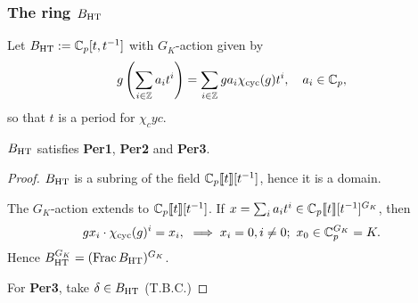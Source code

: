 \subsubsection{The ring \texorpdfstring{$B_{\mathrm{HT}}$}{B-HT}}

Let $B_{\mathrm{HT}} := \mathbb{C}_p[t, t^{-1}]$ with $G_K$-action given by \[g\left( \sum_{i\in\mathbb{Z}} a_it^i  \right) = \sum_{i\in\mathbb{Z}} ga_i\chi_{\mathrm{cyc}}(g)t^i,\quad a_i\in\mathbb{C}_p,\]
so that $t$ is a period for $\chi_cyc$.
\begin{proposition}
    $B_{\mathrm{HT}}$ satisfies \textbf{Per1}, \textbf{Per2} and \textbf{Per3}.
\end{proposition}
\begin{proof}
    $B_{\mathrm{HT}}$ is a subring of the field $\mathbb{C}_p\llbracket t \rrbracket[t^{-1}]$, hence it is a domain.

    The $G_K$-action extends to $\mathbb{C}_p\llbracket t \rrbracket[t^{-1}]$.
    If $x = \sum_i a_it^i\in\mathbb{C}_p\llbracket t \rrbracket[t^{-1}]^{G_K}$, then \[
    gx_i\cdot\chi_{\mathrm{cyc}}(g)^i = x_i,\ \implies x_i = 0, i\ne 0;\ x_0\in\mathbb{C}_p^{G_K} = K.\]
    Hence $B_{\mathrm{HT}}^{G_K} = (\operatorname{Frac} B_{\mathrm{HT}})^{G_K}$.

    For \textbf{Per3}, take $\delta\in B_{\mathrm{HT}}$
    (T.B.C.)
\end{proof}
